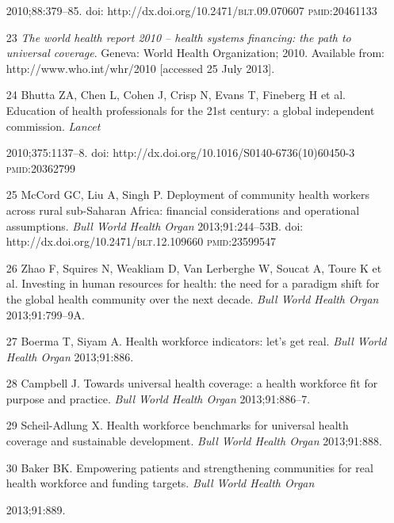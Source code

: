 \documentclass{article}
\begin{document}
\begin{itemize}
2010;88:379–85. doi: http://dx.doi.org/10.2471/\textsc{blt}.09.070607 \textsc{pmid}:20461133

\item[23] \textit{The world health report 2010 – health systems financing: the
path to
universal coverage}. Geneva: World Health Organization; 2010. Available from:
http://www.who.int/whr/2010 [accessed 25 July 2013].

\item[24] Bhutta ZA, Chen L, Cohen J, Crisp N, Evans T, Fineberg H et al.
Education of health
professionals for the 21st century: a global independent commission.
\textit{Lancet}

2010;375:1137–8. doi: http://dx.doi.org/10.1016/S0140-6736(10)60450-3
\textsc{pmid}:20362799

\item[25] McCord GC, Liu A, Singh P. Deployment of community health workers
across rural
sub-Saharan Africa: financial considerations and operational assumptions.
\textit{Bull World Health
Organ}
2013;91:244–53B. doi: http://dx.doi.org/10.2471/\textsc{blt}.12.109660
\textsc{pmid}:23599547

\item[26] Zhao F, Squires N, Weakliam D, Van Lerberghe W, Soucat A, Toure K et
al. Investing
in human resources for health: the need for a paradigm shift for the global
health community over
the next decade. \textit{Bull World Health Organ}
2013;91:799–9A.

\item[27] Boerma T, Siyam A. Health workforce indicators: let’s get real.
\textit{Bull World
Health Organ}
2013;91:886.

\item[28] Campbell J. Towards universal health coverage: a health workforce fit
for purpose
and practice. \textit{Bull World Health Organ}
2013;91:886–7.

\item[29] Scheil-Adlung X. Health workforce benchmarks for universal health
coverage and
sustainable development. \textit{Bull World Health Organ}
2013;91:888.

\item[30] Baker BK. Empowering patients and strengthening communities for real
health
workforce and funding targets. \textit{Bull World Health Organ}

2013;91:889.

\end{itemize}


\end{document}

